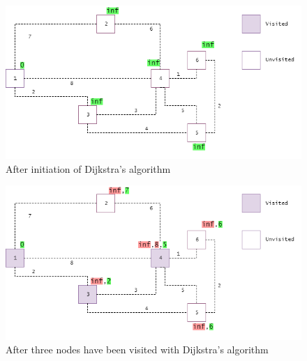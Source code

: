 \documentclass {article}
\begin{document}
\begin{figure}[H]
\includegraphics[width=\textwidth]{dijkstras-algorithm-example1}
 

\caption{After initiation of Dijkstra's algorithm}
\label{fig:dijkstras-algorithm-example1}
\end{figure}
\begin{figure}[H]
\includegraphics[width=\textwidth]{dijkstras-algorithm-example2}

\caption{After three nodes have been visited with Dijkstra's algorithm}
\label{fig:dijkstras-algorithm-example2}
\end{figure}
 
\end{document}
